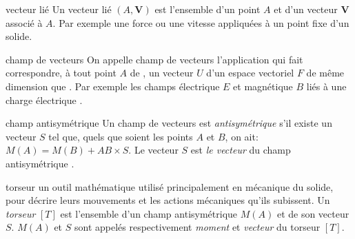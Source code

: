 



{vecteur lié}
{Un vecteur lié $(A,\textbf{V})$ est l'ensemble d'un point $A$ et d'un vecteur $\textbf{V}$ associé à $A$. Par exemple une force ou une vitesse appliquées à un point fixe d'un solide.}

{champ de vecteurs}
{On appelle champ de vecteurs l'application qui fait correspondre, à tout point $A$ de \varepsilon, un vecteur $U$ d'un espace vectoriel $F$ de même dimension que \varepsilon. Par exemple les champs électrique $E$ et magnétique $B$ liés à une charge électrique \cite{bib_champVecteurs}.}

{champ antisymétrique}
{Un champ de vecteurs est \emph{antisymétrique} s'il existe un vecteur $S$ tel que, quels que soient les points $A$ et $B$, on ait: $M(A)=M(B)+AB \times S$. Le vecteur $S$ est \emph{le vecteur} du champ antisymétrique \cite{bib_champVecteurs}.}

{torseur}
{un outil mathématique utilisé principalement en mécanique du solide, pour décrire leurs mouvements et les actions mécaniques qu'ils subissent. Un \emph{torseur} $[T]$ est l'ensemble d'un champ antisymétrique $M(A)$ et de son vecteur $S$. $M(A)$ et $S$ sont appelés respectivement \emph{moment} et \emph{vecteur} du torseur $[T]$.}




